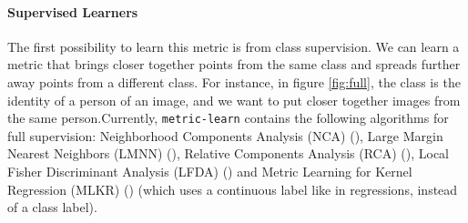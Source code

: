 \documentclass[twoside,11pt]{article}
\begin{document}
\paragraph{Supervised Learners}
The first possibility to learn this metric is from class supervision. We can learn a metric that brings closer together points from the same class and spreads further away points from a different class. For instance, in figure \ref{fig:full}, the class is the identity of a person of an image, and we want to put closer together images from the same person.Currently, \texttt{metric-learn} contains the following algorithms for full supervision: Neighborhood Components Analysis (NCA) (\cite{Goldberger04}), Large Margin Nearest Neighbors (LMNN) (\cite{Weinberger09}), Relative Components Analysis (RCA) (\cite{Shental02}), Local Fisher Discriminant Analysis (LFDA) (\cite{Sugiyama07}) and Metric Learning for Kernel Regression (MLKR) (\cite{Weinberger07}) (which uses a continuous label like in regressions, instead of a class label).


\end{document}
